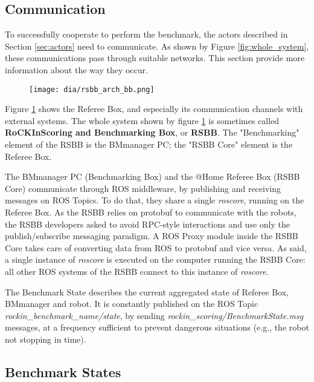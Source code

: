 \documentclass[a4paper]{article}
\newcommand{\ro}{RoCKIn}
\begin{document}
\subsection{Communication}

To successfully cooperate to perform the benchmark, the actors described in Section \ref{sec:actors} need to communicate. As shown by Figure \ref{fig:whole_system}, these communications pass through suitable networks. This section provide more information about the way they occur. 

\begin{figure}[h!]
  \centering
  \texttt{[image: dia/rsbb\_arch\_bb.png]}
  \label{fig:refbox_comms}
\end{figure}

Figure \ref{fig:refbox_comms} shows the Referee Box, and especially its communication channels with external systems. The whole system shown by figure \ref{fig:refbox_comms} is sometimes called \textbf{\ro Scoring and Benchmarking Box}, or \textbf{RSBB}. The "Benchmarking" element of the RSBB is the BMmanager PC; the "RSBB Core" element is the Referee Box.

The BMmanager PC (Benchmarking Box) and the @Home Referee Box (RSBB Core) communicate through ROS middleware, by publishing and receiving messages on ROS Topics. To do that, they share a single \textit{roscore}, running on the Referee Box.
As the RSBB relies on protobuf to communicate with the robots, the RSBB developers asked to avoid RPC-style interactions and use only the publish/subscribe messaging paradigm.
A ROS Proxy module inside the RSBB Core takes care of converting data from ROS to protobuf and vice versa.
As said, a single instance of \emph{roscore} is executed on the computer running the RSBB Core: all other ROS systems of the RSBB connect to this instance of \emph{roscore}.

The Benchmark State describes the current aggregated state of Referee Box, BMmanager and robot. It is constantly published on the ROS Topic \emph{rockin\_benchmark\_name/state}, by sending \emph{rockin\_scoring/BenchmarkState.msg} messages, at a frequency sufficient to prevent dangerous situations (e.g., the robot not stopping in time).


\subsection{Benchmark States}
\end{document}
